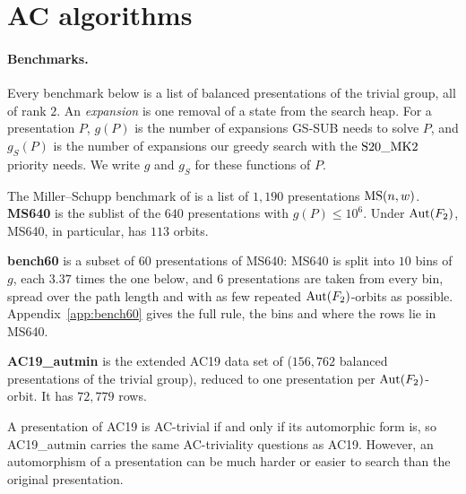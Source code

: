 \section{AC algorithms}\label{sec:ac}


\paragraph{Benchmarks.} Every benchmark below is a list of balanced presentations of the trivial
group, all of rank $2$. An \emph{expansion} is one removal of a state from the search heap. For a
presentation $P$, $g(P)$ is the number of expansions GS-SUB \cite{FTS26} needs to solve $P$, and
$g_S(P)$ is the number of expansions our greedy search with the $\mathrm{S20\_MK2}$ priority needs. We write $g$
and $g_S$ for these functions of $P$.

\begin{definition}[MS640]
The Miller--Schupp benchmark of \cite{SMM24} is a list of $1{,}190$ presentations $\mathrm{MS}(n,w)$. \textbf{MS640}
\cite{FTS26} is the sublist of the $640$ presentations with $g(P)\le10^6$. Under $\operatorname{Aut}(F_2)$, MS640, in particular, has $113$ orbits.
\end{definition}

\begin{definition}[bench60]\label{def:bench60}
\textbf{bench60} is a subset of $60$ presentations of MS640: MS640 is split into $10$ bins of $g$, each $3.37$ times
the one below, and $6$ presentations are taken from every bin, spread over the path length and with as few repeated
$\operatorname{Aut}(F_2)$-orbits as possible. Appendix~\ref{app:bench60} gives the full rule, the bins and where the rows lie in
MS640.
\end{definition}

\begin{definition}[AC19\_autmin]\label{def:ac19}
\textbf{AC19\_autmin} is the extended AC19 data set of \cite{FTS26} ($156{,}762$ balanced
presentations of the trivial group), reduced to one presentation per $\operatorname{Aut}(F_2)$-orbit.
It has $72{,}779$ rows.
\end{definition}

A presentation of AC19 is AC-trivial if and only if its automorphic form is, so AC19\_autmin
carries the same AC-triviality questions as AC19. However, an automorphism of a presentation can be much harder or easier to search than the original presentation.

